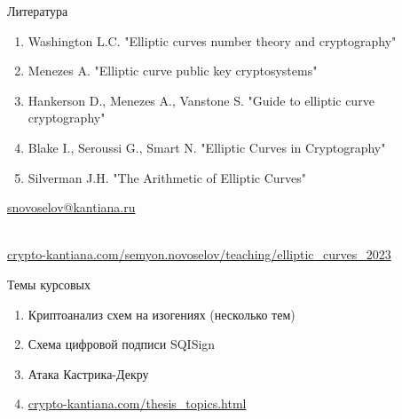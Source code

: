 \documentclass{beamer}
\begin{document}
\begin{frame}{Литература}
\begin{enumerate}
    \item Washington L.C. "Elliptic curves number theory and cryptography"%
    \item Menezes A. "Elliptic curve public key cryptosystems"
    \item Hankerson D., Menezes A., Vanstone S. "Guide to elliptic curve cryptography"
    \item Blake I., Seroussi G., Smart N. "Elliptic Curves in Cryptography"
    \item Silverman J.H. "The Arithmetic of Elliptic Curves"%
\end{enumerate}


\begin{center}
    \begin{tcolorbox}[enhanced,hbox,colback=block-green-color-bg,colframe=subsection-color!120,title=Контакты,center title]
        \begin{varwidth}{\textwidth}
            \begin{center}
                \href{mailto:snovoselov@kantiana.ru}{snovoselov@kantiana.ru}
            \end{center}
        \end{varwidth}
    \end{tcolorbox}	
\end{center}

\\
{\footnotesize
    \href{https://crypto-kantiana.com/semyon.novoselov/teaching/elliptic_curves_2023}{crypto-kantiana.com/semyon.novoselov/teaching/elliptic\_curves\_2023}
}
\end{frame}

\begin{frame}{Темы курсовых}
	\begin{enumerate}
		\item Криптоанализ схем на изогениях (несколько тем)
		\item Схема цифровой подписи SQISign
		\item Атака Кастрика-Декру
		\item \href{https://crypto-kantiana.com/thesis_topics.html}{crypto-kantiana.com/thesis\_topics.html}
	\end{enumerate}
\end{frame}
\end{document}
